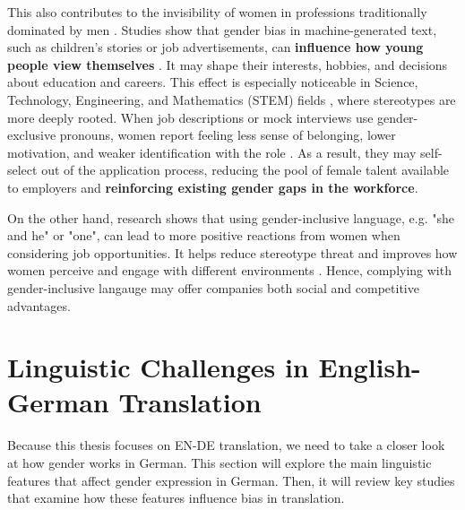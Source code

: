 This also contributes to the invisibility of women in professions traditionally dominated by men \citep{kapplAreAllSpanish2025}. Studies show that gender bias in machine-generated text, such as children's stories or job advertisements, can \textbf{influence how young people view themselves} \citep{soundararajanInvestigatingGenderBias2024,kapplAreAllSpanish2025}. It may shape their interests, hobbies, and decisions about education and careers. This effect is especially noticeable in Science, Technology, Engineering, and Mathematics (STEM) fields \citep{pratesAssessingGenderBias2019}, where stereotypes are more deeply rooted. When job descriptions or mock interviews use gender-exclusive pronouns, women report feeling less sense of belonging, lower motivation, and weaker identification with the role \citep{godsilEffectsGenderRoles2016}. As a result, they may self-select out of the application process, reducing the pool of female talent available to employers and \textbf{reinforcing existing gender gaps in the workforce}.

On the other hand, research shows that using gender-inclusive language, e.g. "she and he" or "one", can lead to more positive reactions from women when considering job opportunities. It helps reduce stereotype threat and improves how women perceive and engage with different environments \citep{ godsilEffectsGenderRoles2016}. Hence, complying with gender-inclusive langauge may offer companies both social and competitive advantages.


\section{Linguistic Challenges in English-German Translation}

Because this thesis focuses on EN-DE translation, we need to take a closer look at how gender works in German. This section will explore the main linguistic features that affect gender expression in German. Then, it will review key studies that examine how these features influence bias in translation.

